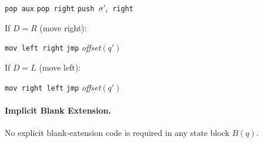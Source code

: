 \begin{algorithmic}
\State \texttt{pop aux} 
\State \texttt{pop right} 
\State \texttt{push $\sigma'_i$ right} 
\end{algorithmic}

\noindent
If $D = R$ (move right):
\begin{algorithmic}
\State \texttt{mov left right} 
\State \texttt{jmp} \textit{offset}$(q')$ 
\end{algorithmic}

\noindent
If $D = L$ (move left):
\begin{algorithmic}
\State \texttt{mov right left} 
\State \texttt{jmp} \textit{offset}$(q')$ 
\end{algorithmic}

\paragraph{Implicit Blank Extension.}

\begin{lemma}
No explicit blank-extension code is required in any state block $B(q)$.
\end{lemma}

